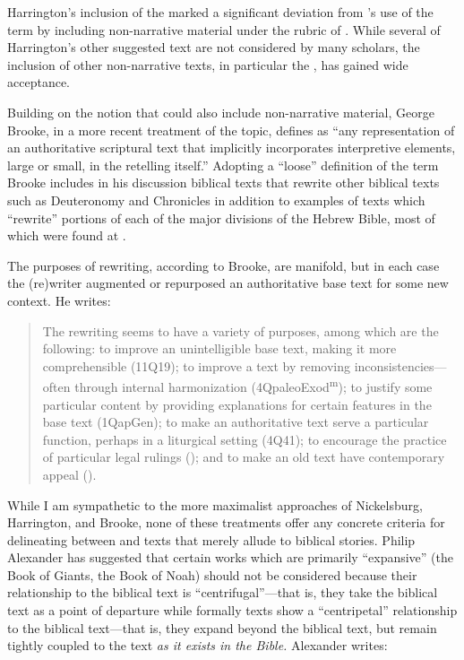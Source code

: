  Harrington's inclusion of the \templescroll marked a significant deviation from \vermes's use of the term by including non-narrative material under the rubric of \rwb. While several of Harrington's other suggested text are not considered \rwb by many scholars, the inclusion of other non-narrative texts, in particular the \templescroll, has gained wide acceptance.\autocite{bernstein_textus2005} 

 Building on the notion that \rwb could also include non-narrative material, George Brooke, in a more recent treatment of the topic, defines \rwb as ``any representation of an authoritative scriptural text that implicitly incorporates interpretive elements, large or small, in the retelling itself.''\autocite[777]{brooke_schiffman-vanderkam2000} Adopting a ``loose'' definition of the term Brooke includes in his discussion biblical texts that rewrite other biblical texts such as Deuteronomy and Chronicles in addition to examples of texts which ``rewrite'' portions of each of the major divisions of the Hebrew Bible, most of which were found at \qumran.\autocites[Brooke categorizes the texts as follows: Reworked Pentateuchs, Rewritten Pentateuchal narratives, Rewritten Pentateuchal laws, Rewritten Former Prophets, Rewritten Latter Prophets, and Rewritten Writings.][778--780]{brooke_schiffman-vanderkam2000}[See also][]{brooke_herbert-tov2002} 

 The purposes of rewriting, according to Brooke, are manifold, but in each case the (re)writer augmented or repurposed an authoritative base text for some new context. He writes: 

 \begin{quote} The rewriting seems to have a variety of purposes, among which are the following: to improve an unintelligible base text, making it more comprehensible (11Q19); to improve a text by removing inconsistencies---often through internal harmonization (4QpaleoExod\textsuperscript{m}); to justify some particular content by providing explanations for certain features in the base text (1QapGen); to make an authoritative text serve a particular function, perhaps in a liturgical setting (4Q41); to encourage the practice of particular legal rulings (\jub); and to make an old text have contemporary appeal (\templescroll).\autocite[778]{brooke_schiffman-vanderkam2000} \end{quote} 

 While I am sympathetic to the more maximalist approaches of Nickelsburg, Harrington, and Brooke, none of these treatments offer any concrete criteria for delineating between \rwb and texts that merely allude to biblical stories. Philip Alexander has suggested that certain works which are primarily ``expansive'' (the Book of Giants, the Book of Noah) should not be considered \rwb because their relationship to the biblical text is ``centrifugal''---that is, they take the biblical text as a point of departure while formally \rwb texts show a ``centripetal'' relationship to the biblical text---that is, they expand beyond the biblical text, but remain tightly coupled to the text \emph{as it exists in the Bible.} Alexander writes: 


